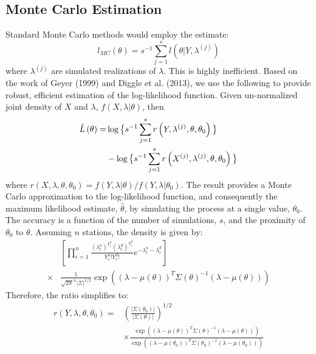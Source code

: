 \documentclass{acm_proc_article-sp}
\begin{document}
\subsection{Monte Carlo Estimation} \label{mc_estimation}
Standard Monte Carlo methods would employ the estimate:
\begin{equation}
l_{MC} (\theta) = s^{-1} \sum_{j=1}^s l \left( \theta | Y, \lambda^{(j)} \right)
\end{equation}
\noindent where $\lambda^{(j)}$ are simulated realizations of $\lambda$.  This is highly inefficient.  Based on the work of Geyer (1999) and Diggle et al. (2013), we use the following to provide robust, efficient estimation of the log-likelihood function.  Given un-normalized joint density of $X$ and $\lambda$, $f(X, \lambda | \theta)$, then 
\begin{align}
\hat{L} \left( \theta \right) =& \log \big \{ s^{-1} \sum_{j=1}^s r \left( Y , \lambda^{(j)} , \theta, \theta_0 \right) \big \} \label{approx_lik} \\
&- \log \big \{ s^{-1} \sum_{j=1}^s r \left( X^{(j)} , \lambda^{(j)} , \theta, \theta_0 \right) \big \} \notag
\end{align}
\noindent where $r(X, \lambda, \theta, \theta_0) = f(Y, \lambda | \theta)/f(Y, \lambda | \theta_0)$. The result provides a Monte Carlo approximation to the log-likelihood function, and consequently the maximum likelihood estimate, $\hat{\theta}$, by simulating the process at a single value, $\theta_0$.  The accuracy is a function of the number of simulations, $s$, and the proximity of $\theta_0$ to $\theta$.   Assuming $n$ stations, the density is given by:
\begin{align*}
&\left[ \prod_{i=1}^n \frac{(\lambda_i^a)^{Y_i^a}(\lambda_i^d)^{Y_i^d}}{Y_i^a ! Y_i^d !} e^{-\lambda_i^a - \lambda_i^d} \right] \\
\times& \frac{1}{\sqrt{2 \pi}^n |\Sigma|^{1/2}} \exp \left( (\lambda - \mu(\theta))^T \Sigma(\theta)^{-1} (\lambda - \mu(\theta) ) \right)
\end{align*}
Therefore, the ratio simplifies to:
\begin{align*}
r(Y,\lambda, \theta, \theta_0) =& \left(\frac{|\Sigma (\theta_0)|}{|\Sigma (\theta)|} \right)^{1/2} \\
&\times \frac{\exp \left( (\lambda - \mu(\theta))^T \Sigma(\theta)^{-1} (\lambda - \mu(\theta) ) \right)}{\exp \left( (\lambda - \mu(\theta_0))^T \Sigma(\theta_0)^{-1} (\lambda - \mu(\theta_0) ) \right)} \\
\end{align*}
\end{document}
